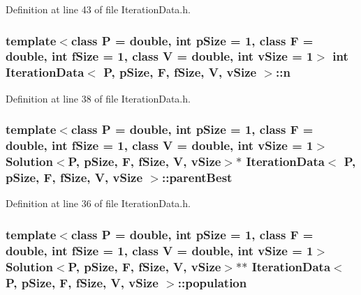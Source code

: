 Definition at line 43 of file Iteration\+Data.\+h.

\subsubsection[{\texorpdfstring{n}{n}}]{\setlength{\rightskip}{0pt plus 5cm}template$<$class P = double, int p\+Size = 1, class F = double, int f\+Size = 1, class V = double, int v\+Size = 1$>$ int {\bf Iteration\+Data}$<$ P, p\+Size, F, f\+Size, V, v\+Size $>$\+::n}\hypertarget{structIterationData_a6099161959b928a1b4aeecbb46b9e407}{}\label{structIterationData_a6099161959b928a1b4aeecbb46b9e407}


Definition at line 38 of file Iteration\+Data.\+h.

\subsubsection[{\texorpdfstring{parent\+Best}{parentBest}}]{\setlength{\rightskip}{0pt plus 5cm}template$<$class P = double, int p\+Size = 1, class F = double, int f\+Size = 1, class V = double, int v\+Size = 1$>$ {\bf Solution}$<$P, p\+Size, F, f\+Size, V, v\+Size$>$$\ast$ {\bf Iteration\+Data}$<$ P, p\+Size, F, f\+Size, V, v\+Size $>$\+::parent\+Best}\hypertarget{structIterationData_a390c6765ad4283ec89bba56ba33f27a2}{}\label{structIterationData_a390c6765ad4283ec89bba56ba33f27a2}


Definition at line 36 of file Iteration\+Data.\+h.

\subsubsection[{\texorpdfstring{population}{population}}]{\setlength{\rightskip}{0pt plus 5cm}template$<$class P = double, int p\+Size = 1, class F = double, int f\+Size = 1, class V = double, int v\+Size = 1$>$ {\bf Solution}$<$P, p\+Size, F, f\+Size, V, v\+Size$>$$\ast$$\ast$ {\bf Iteration\+Data}$<$ P, p\+Size, F, f\+Size, V, v\+Size $>$\+::population}\hypertarget{structIterationData_a1f3b9d4dd52556507d2ec1a11c2ce6c4}{}\label{structIterationData_a1f3b9d4dd52556507d2ec1a11c2ce6c4}


